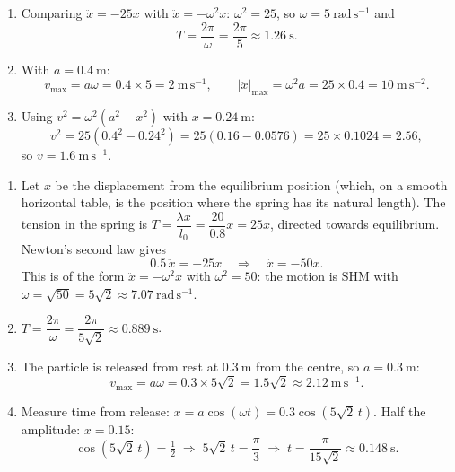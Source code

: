 \documentclass[11pt]{article}
\begin{document}
\begin{corrige}
\begin{enumerate}
\item Comparing $\ddot{x} = -25x$ with $\ddot{x} = -\omega^2 x$: $\omega^2 = 25$, so $\omega = 5\ \mathrm{rad\,s^{-1}}$ and
\[
T = \frac{2\pi}{\omega} = \frac{2\pi}{5} \approx 1.26\ \mathrm{s}.
\]
\item With $a = 0.4\ \mathrm{m}$:
\[
v_{\max} = a\omega = 0.4 \times 5 = 2\ \mathrm{m\,s^{-1}}, \qquad |\ddot{x}|_{\max} = \omega^2 a = 25 \times 0.4 = 10\ \mathrm{m\,s^{-2}}.
\]
\item Using $v^2 = \omega^2(a^2 - x^2)$ with $x = 0.24\ \mathrm{m}$:
\[
v^2 = 25\left(0.4^2 - 0.24^2\right) = 25(0.16 - 0.0576) = 25 \times 0.1024 = 2.56,
\]
so $v = 1.6\ \mathrm{m\,s^{-1}}$.
\end{enumerate}
\end{corrige}

\begin{corrige}
\begin{enumerate}
\item Let $x$ be the displacement from the equilibrium position (which, on a smooth horizontal table, is the position where the spring has its natural length). The tension in the spring is $T = \dfrac{\lambda x}{l_0} = \dfrac{20}{0.8}x = 25x$, directed towards equilibrium. Newton's second law gives
\[
0.5\,\ddot{x} = -25x \quad\Longrightarrow\quad \ddot{x} = -50x.
\]
This is of the form $\ddot{x} = -\omega^2 x$ with $\omega^2 = 50$: the motion is SHM with $\omega = \sqrt{50} = 5\sqrt{2} \approx 7.07\ \mathrm{rad\,s^{-1}}$.
\item $T = \dfrac{2\pi}{\omega} = \dfrac{2\pi}{5\sqrt{2}} \approx 0.889\ \mathrm{s}$.
\item The particle is released from rest at $0.3\ \mathrm{m}$ from the centre, so $a = 0.3\ \mathrm{m}$:
\[
v_{\max} = a\omega = 0.3 \times 5\sqrt{2} = 1.5\sqrt{2} \approx 2.12\ \mathrm{m\,s^{-1}}.
\]
\item Measure time from release: $x = a\cos(\omega t) = 0.3\cos(5\sqrt{2}\,t)$. Half the amplitude: $x = 0.15$:
\[
\cos(5\sqrt{2}\,t) = \tfrac{1}{2} \;\Longrightarrow\; 5\sqrt{2}\,t = \frac{\pi}{3} \;\Longrightarrow\; t = \frac{\pi}{15\sqrt{2}} \approx 0.148\ \mathrm{s}.
\]
\end{enumerate}
\end{corrige}
\end{document}

